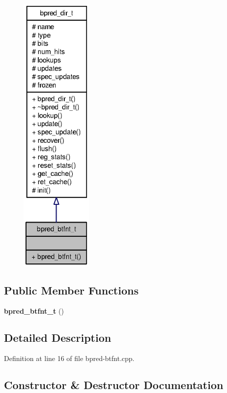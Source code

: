 \begin{figure}[H]
\begin{center}
\leavevmode
\includegraphics[height=400pt]{classbpred__btfnt__t__coll__graph}
\end{center}
\end{figure}
\subsection*{Public Member Functions}
\begin{CompactItemize}
\item 
{\bf bpred\_\-btfnt\_\-t} ()
\end{CompactItemize}


\subsection{Detailed Description}


Definition at line 16 of file bpred-btfnt.cpp.

\subsection{Constructor \& Destructor Documentation}
